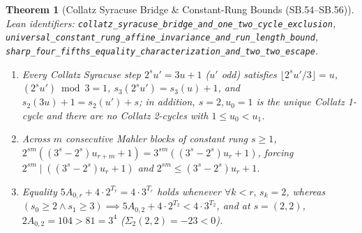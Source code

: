 \documentclass[11pt]{article}
\newtheorem{theorem}{Theorem}[section]
\begin{document}
\begin{theorem}[Collatz Syracuse Bridge \& Constant-Rung Bounds (SB.54--SB.56)]
\emph{Lean identifiers:} \nolinkurl{collatz_syracuse_bridge_and_one_two_cycle_exclusion}, \nolinkurl{universal_constant_rung_affine_invariance_and_run_length_bound}, \nolinkurl{sharp_four_fifths_equality_characterization_and_two_two_escape}.
\begin{enumerate}
  \item Every Collatz Syracuse step $2^s u' = 3 u + 1$ ($u'$ odd) satisfies $\lfloor 2^s u' / 3 \rfloor = u$, $(2^s u') \bmod 3 = 1$, $s_3(2^s u') = s_3(u) + 1$, and $s_2(3 u) + 1 = s_2(u') + s$; in addition, $s = 2, u_0 = 1$ is the unique Collatz 1-cycle and there are no Collatz 2-cycles with $1 \le u_0 < u_1$.
  \item Across $m$ consecutive Mahler blocks of constant rung $s \ge 1$, $2^{s m}((3^s - 2^s) u_{r+m} + 1) = 3^{s m}((3^s - 2^s) u_r + 1)$, forcing $2^{s m} \mid ((3^s - 2^s) u_r + 1)$ and $2^{s m} \le (3^s - 2^s) u_r + 1$.
  \item Equality $5 A_{0,r} + 4 \cdot 2^{T_r} = 4 \cdot 3^{T_r}$ holds whenever $\forall k < r,\, s_k = 2$, whereas $(s_0 \ge 2 \wedge s_1 \ge 3) \implies 5 A_{0,2} + 4 \cdot 2^{T_2} < 4 \cdot 3^{T_2}$, and at $s = (2, 2)$, $2 A_{0,2} = 104 > 81 = 3^4$ ($\Sigma_2(2,2) = -23 < 0$).
\end{enumerate}
\end{theorem}
\end{document}
